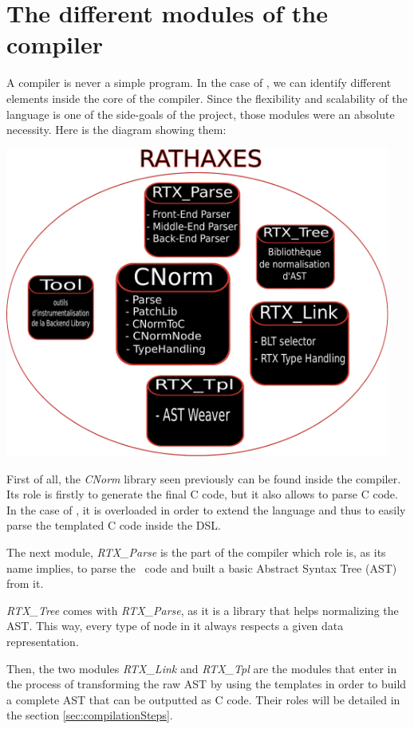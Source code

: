 \documentclass[american]{rtxreport}
\begin{document}
\section{The different modules of the compiler}

A compiler is never a simple program. In the case of \rtx, we can identify
different elements inside the core of the compiler. Since the flexibility and
scalability of the language is one of the side-goals of the project,
those modules were an absolute necessity. Here is the diagram showing them:

\includegraphics[width=0.95\textwidth]{diagramme_architecture.pdf}

First of all, the \emph{CNorm} library seen previously can be found inside the
compiler. Its role is firstly to generate the final C code, but it also allows
to parse C code. In the case of \rtx, it is overloaded in order to extend
the language and thus to easily parse the templated C code inside the DSL.

The next module, \emph{RTX\_Parse} is the part of the compiler which role is,
as its name implies, to parse the \rtx\ code and built a basic Abstract
Syntax Tree (AST) from it.

\emph{RTX\_Tree} comes with \emph{RTX\_Parse}, as it is a library that helps
normalizing the AST. This way, every type of node in it always respects a given
data representation.

Then, the two modules \emph{RTX\_Link} and \emph{RTX\_Tpl} are the modules that
enter in the process of transforming the raw AST by using the templates in
order to build a complete AST that can be outputted as C code. Their roles will
be detailed in the section \ref{sec:compilationSteps}.
\end{document}
